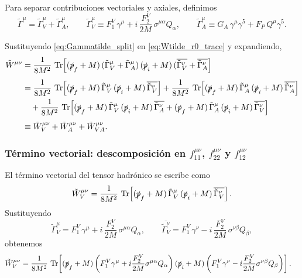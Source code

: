 Para separar contribuciones vectoriales y axiales, definimos
\begin{equation}
\tilde{\Gamma}^{\mu}=\tilde{\Gamma}^{\mu}_{V}+\tilde{\Gamma}^{\mu}_{A},
\qquad
\tilde{\Gamma}^{\mu}_{V}\equiv
F_1^V\,\gamma^{\mu}
+i\,\frac{F_2^V}{2M}\,\sigma^{\mu\alpha}Q_\alpha,
\qquad
\tilde{\Gamma}^{\mu}_{A}\equiv
G_A\,\gamma^{\mu}\gamma^{5}
+F_P\,Q^{\mu}\gamma^{5}.
\label{eq:Gammatilde_split}
\end{equation}

Sustituyendo \eqref{eq:Gammatilde_split} en \eqref{eq:Wtilde_r0_trace} y expandiendo,
\begin{align}
\tilde{W}^{\mu \nu}
&=
\frac{1}{8M^2}\,
\Tr\!\left[(\slashed{p}_f+M)\,(\tilde{\Gamma}^{\mu}_{V}+\tilde{\Gamma}^{\mu}_{A})\,(\slashed{p}_i+M)\,(\overline{\tilde{\Gamma}^{\nu}_{V}}+\overline{\tilde{\Gamma}^{\nu}_{A}}\right]
\nonumber\\[4pt]
&=
\frac{1}{8M^2}\,
\Tr\!\left[(\slashed{p}_f+M)\,\tilde{\Gamma}^{\mu}_{V}\,(\slashed{p}_i+M)\,\overline{\tilde{\Gamma}^{\nu}_{V}}\right]
+
\frac{1}{8M^2}\,
\Tr\!\left[(\slashed{p}_f+M)\,\tilde{\Gamma}^{\mu}_{A}\,(\slashed{p}_i+M)\,\overline{\tilde{\Gamma}^{\nu}_{A}}\right]
\nonumber\\
&\quad+
\frac{1}{8M^2}\,
\Tr\!\left[(\slashed{p}_f+M)\,\tilde{\Gamma}^{\mu}_{V}\,(\slashed{p}_i+M)\,\overline{\tilde{\Gamma}^{\nu}_{A}}
+(\slashed{p}_f+M)\,\tilde{\Gamma}^{\mu}_{A}\,(\slashed{p}_i+M)\,\overline{\tilde{\Gamma}^{\nu}_{V}}\right]
\nonumber\\[4pt]
&\equiv
\tilde{W}^{\mu \nu}_{V}+\tilde{W}^{\mu \nu}_{A}+\tilde{W}^{\mu \nu}_{VA}.
\label{eq:Wtilde_r0_split}
\end{align}

\subsubsection{Término vectorial: descomposición en $f_{11}^{\mu\nu}$, $f_{22}^{\mu\nu}$ y $f_{12}^{\mu\nu}$}
\label{app:hadronico:vectorial_munu}

El término vectorial del tensor hadrónico se escribe como
\begin{equation}
\tilde{W}^{\mu\nu}_{V}
=\frac{1}{8M^2}\,
\Tr\!\left[(\slashed{p}_f+M)\,\tilde{\Gamma}^{\mu}_{V}\,(\slashed{p}_i+M)\,\overline{\tilde{\Gamma}^{\nu}_{V}}\right].
\label{eq:WtildeV_munu_def}
\end{equation}
Sustituyendo
\begin{equation}
\tilde{\Gamma}^{\mu}_{V}=F_1^V\,\gamma^{\mu}
+i\,\frac{F_2^V}{2M}\,\sigma^{\mu\alpha}Q_\alpha,
\qquad
\overline{\tilde{\Gamma}^{\nu}_{V}}=F_1^V\,\gamma^{\nu}
-i\,\frac{F_2^V}{2M}\,\sigma^{\nu\beta}Q_\beta,
\label{eq:GammatildeV_munu}
\end{equation}
obtenemos
\begin{align}
\tilde{W}^{\mu\nu}_{V}
&=
\frac{1}{8M^2}\,
\Tr\!\left[
(\slashed{p}_f+M)
\left(F_1^V\gamma^{\mu}+i\frac{F_2^V}{2M}\sigma^{\mu\alpha}Q_\alpha\right)
(\slashed{p}_i+M)
\left(F_1^V\gamma^{\nu}-i\frac{F_2^V}{2M}\sigma^{\nu\beta}Q_\beta\right)
\right].
\label{eq:WtildeV_munu_expand0}
\end{align}

